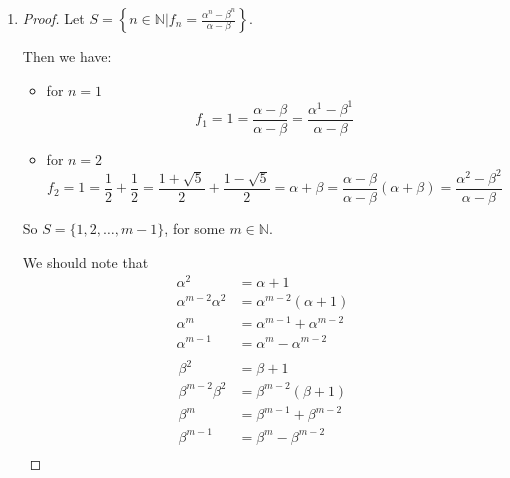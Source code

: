 \documentclass[12pt,letterpaper]{article}
\newcommand*\PCI{%
  Principle of Complete Induction%
}
\begin{document}
\begin{enumerate}
\begin{enumerate}
\begin{enumerate}
\begin{proof}
                Thus, by the \PCI, $S = \mathbb{N}$.
              \end{proof}
            \item
              \begin{proof}
                Let $S = \left\{n \in \mathbb{N} | f_n = \frac{\alpha^n - \beta^n}{\alpha - \beta}\right\}$.

                Then we have:

                \begin{itemize}
                  \item for $n = 1$
                  \[f_1 = 1 = \frac{\alpha - \beta}{\alpha - \beta} = \frac{\alpha^1 - \beta^1}{\alpha - \beta}\]
                  \item for $n = 2$
                  \[f_2 = 1 = \frac{1}{2} + \frac{1}{2} = \frac{1 + \sqrt{5}}{2} + \frac{1 - \sqrt{5}}{2} = \alpha + \beta = \frac{\alpha - \beta}{\alpha - \beta}\left(\alpha + \beta\right) = \frac{\alpha^2 - \beta^2}{\alpha - \beta}\]
                \end{itemize}

                So $S = \{1, 2, \dots, m - 1\}$, for some $m \in \mathbb{N}$.

                We should note that
                \begin{align*}
                  \alpha^2 &= \alpha + 1 \\
                  \alpha^{m - 2}\alpha^2 &= \alpha^{m - 2}\left(\alpha + 1\right) \\
                  \alpha^m &= \alpha^{m - 1} + \alpha^{m - 2} \\
                  \alpha^{m - 1} &= \alpha^m - \alpha^{m - 2} \\
                \end{align*}
                \begin{align*}
                  \beta^2 &= \beta + 1 \\
                  \beta^{m - 2}\beta^2 &= \beta^{m - 2}\left(\beta + 1\right) \\
                  \beta^m &= \beta^{m - 1} + \beta^{m - 2} \\
                  \beta^{m - 1} &= \beta^m - \beta^{m - 2} \\
                \end{align*}


\end{proof}
\end{enumerate}
\end{enumerate}
\end{enumerate}
\end{document}
